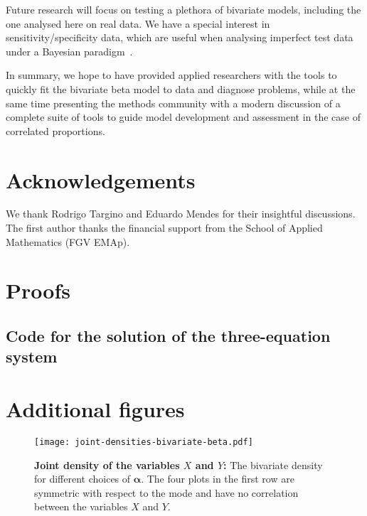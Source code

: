 \documentclass[a4paper, notitlepage, 10pt]{article}
\theoremstyle{definition}
\begin{document}
Future research will focus on testing a plethora of bivariate models, including the one analysed here on real data.
We have a special interest in sensitivity/specificity data, which are useful when analysing imperfect test data under a Bayesian paradigm~\citep{gelman2020bayesian}.

In summary, we hope to have provided applied researchers with the tools to quickly fit the bivariate beta model to data and diagnose problems, while  at the same time presenting the methods community with a modern discussion of a complete suite of tools to guide model development and assessment in the case of correlated proportions.
    
\section*{Acknowledgements}
We thank Rodrigo Targino and Eduardo Mendes for their insightful discussions.
The first author thanks the financial support from the School of Applied Mathematics (FGV EMAp).


 

\appendix
\makeatletter 
\renewcommand\thefigure{\thesection.\arabic{figure}}
\renewcommand\thetable{\thesection.\arabic{table}}
\makeatother


\section{Proofs}\label{sec:appendix-proof}

\printProofs{}

\subsection{Code for the solution of the three-equation system}\label{sec:code-solution-three-equations}



\if{ 

}\fi

\newpage
\section{Additional figures}

\begin{figure}[!ht]
  \centering
  \texttt{[image: joint-densities-bivariate-beta.pdf]}
  \caption{{\bf Joint density of the variables $X$ and $Y$:} The bivariate density for different choices of $\boldsymbol{\alpha}$. The four plots in the first row are   symmetric with respect to the mode and have no correlation between the variables $X$ and $Y$.}\label{fig:beta-bivariate}
\end{figure}
\end{document}
